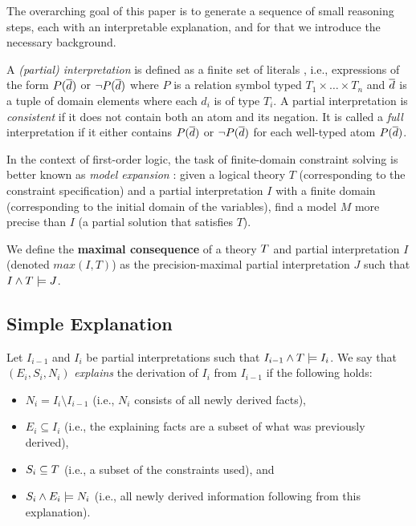The overarching goal of this paper is to generate a sequence of small reasoning steps, each with an interpretable explanation, and for that we introduce the necessary background.

A \emph{(partial) interpretation} is defined as a finite set of literals 
, i.e., expressions of the form 
$P(\overline{d})$ or $\lnot P(\overline{d})$ where $P$ is a relation symbol typed $T_1\times\dots \times T_n$ and $\overline{d}$ is a tuple of domain elements where each $d_i$ is of type $T_i$. 
A partial interpretation is \emph{consistent} if it does not contain both an atom and its negation.
It is called a \emph{full} interpretation if it either contains $P(\overline{d})$ or $\lnot P(\overline{d})$ for each well-typed atom $P(\overline{d})$.

In the context of first-order logic, the task of finite-domain constraint solving is better known as \emph{model expansion} \cite{MitchellTHM06}: given a logical theory $T$ (corresponding to the constraint specification) and a partial interpretation $I$ with a finite domain (corresponding to the initial domain of the variables), find a model $M$ more precise than $I$ (a partial solution that satisfies $T$).

We define the \textbf{maximal consequence} of a theory $T$ and partial interpretation $I$ (denoted $max(I,T)$) as the precision-maximal partial interpretation $J$ such that  $I \wedge T \models J$.

\subsection{Simple Explanation}

Let $I_{i-1}$ and $I_i$ be partial interpretations such that $I_{i-1}\land T \models I_i$.
We say that $(E_i,S_i,N_i)$ \emph{explains} the derivation of $I_{i}$ from $I_{i-1}$ if the following holds:
\begin{itemize}
   \item $N_i= I_i \setminus I_{i-1}$ (i.e., $N_i$ consists of all newly derived facts), 
   \item $E_i\subseteq I_i$ (i.e., the explaining facts are a subset of what was previously derived),
   \item $S_i \subseteq T$ (i.e., a subset of the constraints used), and 
   \item $S_i \land E_i \models N_i$ (i.e., all newly derived information following from this explanation).
\end{itemize}

